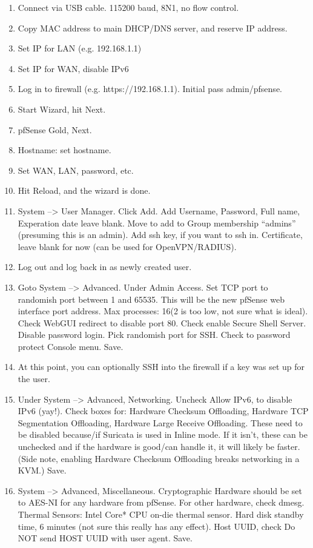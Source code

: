\begin{enumerate}
 \item Connect via USB cable. 115200 baud, 8N1, no flow control.
 \item Copy MAC address to main DHCP/DNS server, and reserve IP address.
 \item Set IP for LAN (e.g. 192.168.1.1)
 \item Set IP for WAN, disable IPv6
 \item Log in to firewall (e.g. https://192.168.1.1).
       Initial pass admin/pfsense.
 \item Start Wizard, hit Next.
 \item pfSense Gold, Next.
 \item Hostname: set hostname.
 \item Set WAN, LAN, password, etc.
 \item Hit Reload, and the wizard is done.
 \item System --> User Manager. Click Add. Add Username, Password, Full name, Experation date leave blank. Move to add to Group membership ``admins'' (presuming this is an admin). Add ssh key, if you want to ssh in. Certificate, leave blank for now (can be used for OpenVPN/RADIUS). 
 \item Log out and log back in as newly created user.
 \item Goto System --> Advanced. Under Admin Access. Set TCP port to randomish port between 1 and 65535. This will be the new pfSense web interface port address. Max processes: 16(2 is too low, not sure what is ideal). Check WebGUI redirect to disable port 80. Check enable Secure Shell Server. Disable password login. Pick randomish port for SSH. Check to password protect Console menu. Save.
 \item At this point, you can optionally SSH into the firewall if a key was set up for the user.
 \item Under System --> Advanced, Networking. Uncheck Allow IPv6, to disable IPv6 (yay!). Check boxes for: Hardware Checksum Offloading, Hardware TCP Segmentation Offloading, Hardware Large Receive Offloading. These need to be disabled because/if Suricata is used in Inline mode. If it isn't, these can be unchecked and if the hardware is good/can handle it, it will likely be faster. (Side note, enabling Hardware Checksum Offloading breaks networking in a KVM.) Save.
 \item System --> Advanced, Miscellaneous. Cryptographic Hardware should be set to AES-NI for any hardware from pfSense. For other hardware, check dmesg. Thermal Sensors: Intel Core* CPU on-die thermal sensor. Hard disk standby time, 6 minutes (not sure this really has any effect). Host UUID, check Do NOT send HOST UUID with user agent. Save.

\end{enumerate}

